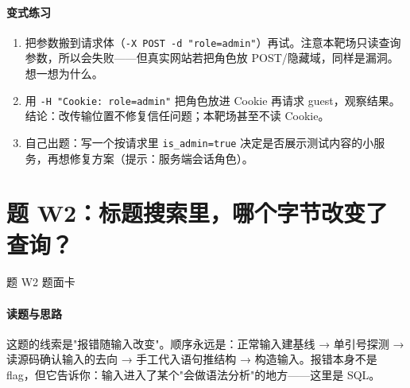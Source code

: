 \documentclass[UTF8,12pt,oneside]{ctexbook}
\begin{document}
\paragraph{变式练习}
\begin{enumerate}
\item 把参数搬到请求体（\verb|-X POST -d "role=admin"|）再试。注意本靶场只读查询参数，所以会失败——但真实网站若把角色放 POST/隐藏域，同样是漏洞。想一想为什么。
\item 用 \verb|-H "Cookie: role=admin"| 把角色放进 Cookie 再请求 guest，观察结果。结论：改传输位置不修复信任问题；本靶场甚至不读 Cookie。
\item 自己出题：写一个按请求里 \verb|is_admin=true| 决定是否展示测试内容的小服务，再想修复方案（提示：服务端会话角色）。
\end{enumerate}

\section{题 W2：标题搜索里，哪个字节改变了查询？}

\begin{challenge}{题 W2 题面卡}
\end{challenge}

\paragraph{读题与思路}
这题的线索是"报错随输入改变"。顺序永远是：正常输入建基线 → 单引号探测 → 读源码确认输入的去向 → 手工代入语句推结构 → 构造输入。报错本身不是 flag，但它告诉你：输入进入了某个"会做语法分析"的地方——这里是 SQL。
\end{document}
